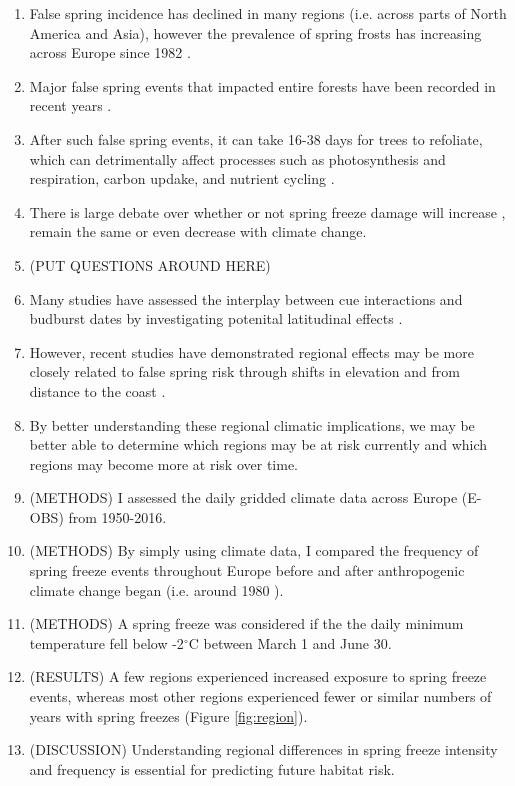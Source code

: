 \documentclass{article}\usepackage[]{graphicx}\usepackage[]{color}
\begin{document}
\begin{enumerate}
\item False spring incidence has declined in many regions (i.e. across parts of North America and Asia), however the prevalence of spring frosts has increasing across Europe since 1982 \citep{Liu2018}.
 
\item Major false spring events that impacted entire forests have been recorded in recent years \citep{Gu2008, Augspurger2009, Augspurger2013, Menzel2015}.
\item After such false spring events, it can take 16-38 days for trees to refoliate, which can detrimentally affect processes such as photosynthesis and respiration, carbon updake, and nutrient cycling \citep{Hufkens2012, Richardson2013, Klosterman2018}.

\item There is large debate over whether or not spring freeze damage will increase \citep{Hannenin1991, Augspurger2013, Labe2016}, remain the same \citep{Scheifinger2003} or even decrease \citep{Kramer1994} with climate change. 
\item (PUT QUESTIONS AROUND HERE)


\item Many studies have assessed the interplay between cue interactions and budburst dates by investigating potenital latitudinal effects \citep{Partanen2004, Viheraaarnio2006, Caffarra2011, Zohner2016, Gauzere2017}.
\item However, recent studies have demonstrated regional effects may be more closely related to false spring risk through shifts in elevation \citep{Vitra2017} and from distance to the coast \citep{Wypych2016a}.
\item By better understanding these regional climatic implications, we may be better able to determine which regions may be at risk currently and which regions may become more at risk over time.



\item (METHODS) I assessed the daily gridded climate data across Europe (E-OBS) from 1950-2016. 
\item (METHODS) By simply using climate data, I compared the frequency of spring freeze events throughout Europe before and after anthropogenic climate change began (i.e. around 1980 \citep{Barnett2001}). 
\item (METHODS) A spring freeze was considered if the the daily minimum temperature fell below -2$^{\circ}$C \citep{Schwartz1993} between March 1 and June 30. 


\item (RESULTS) A few regions experienced increased exposure to spring freeze events, whereas most other regions experienced fewer or similar numbers of years with spring freezes (Figure \ref{fig:region}). 

\item (DISCUSSION) Understanding regional differences in spring freeze intensity and frequency is essential for predicting future habitat risk.

\end{enumerate}
\end{document}
